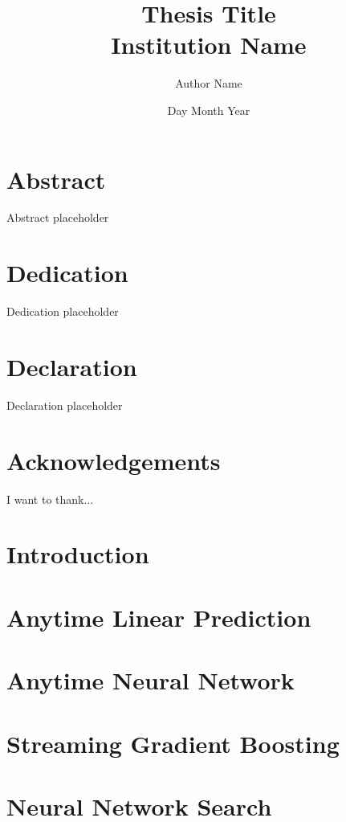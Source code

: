 \documentclass[]{report}
\title{
{Thesis Title}\\
{\large Institution Name}
}
\author{Author Name}
\date{Day Month Year}
\newcommand{\GOMPDIR}{1_gomp}
\newcommand{\SGBDIR}{2_sgb}
\newcommand{\ANNDIR}{3_ann}
\newcommand{\NASDIR}{4_nas}
\begin{document}
\maketitle


\chapter*{Abstract}
Abstract placeholder

\chapter*{Dedication}
Dedication placeholder

\chapter*{Declaration}
Declaration placeholder

\chapter*{Acknowledgements}
I want to thank...

\tableofcontents

\linenumbers
\chapter{Introduction}
\label{chapter:thesis_introduction}


\chapter{Anytime Linear Prediction}
\label{chapter:anytime_linear}


\chapter{Anytime Neural Network}
\label{chapter:ann}


\chapter{Streaming Gradient Boosting}
\label{chapter:sgb}


\chapter{Neural Network Search}
\label{chapter:nas}

\end{document}
